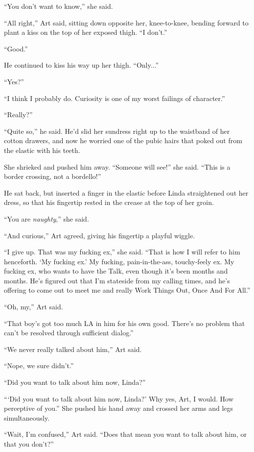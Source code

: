 “You don’t want to know,” she said.

“All right,” Art said, sitting down opposite her, knee-to-knee,
bending forward to plant a kiss on the top of her exposed thigh. “I
don’t.”

“Good.”

He continued to kiss his way up her thigh. “Only...”

“Yes?”

“I think I probably do. Curiosity is one of my worst failings of
character.”

“Really?”

“Quite so,” he said. He’d slid her sundress right up to the
waistband of her cotton drawers, and now he worried one of the
pubic hairs that poked out from the elastic with his teeth.

She shrieked and pushed him away. “Someone will see!” she said.
“This is a border crossing, not a bordello!”

He sat back, but inserted a finger in the elastic before Linda
straightened out her dress, so that his fingertip rested in the
crease at the top of her groin.

“You are \emph{naughty},” she said.

“And curious,” Art agreed, giving his fingertip a playful wiggle.

“I give up. That was my fucking ex,” she said. “That is how I will
refer to him henceforth. ‘My fucking ex.’ My fucking,
pain-in-the-ass, touchy-feely ex. My fucking ex, who wants to have
the Talk, even though it’s been months and months. He’s figured out
that I’m stateside from my calling times, and he’s offering to come
out to meet me and really Work Things Out, Once And For All.”

“Oh, my,” Art said.

“That boy’s got too much LA in him for his own good. There’s no
problem that can’t be resolved through sufficient dialog.”

“We never really talked about him,” Art said.

“Nope, we sure didn’t.”

“Did you want to talk about him now, Linda?”

“‘Did you want to talk about him now, Linda?’ Why yes, Art, I
would. How perceptive of you.” She pushed his hand away and crossed
her arms and legs simultaneously.

“Wait, I’m confused,” Art said. “Does that mean you want to talk
about him, or that you don’t?”


